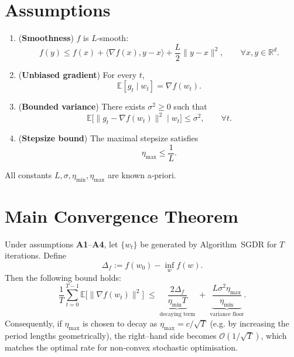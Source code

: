 \documentclass{article}
\begin{document}
\section*{Assumptions}
\begin{enumerate}
  \item[{\bf A1}] (\textbf{Smoothness}) $f$ is $L$‑smooth:
  \[
  f(y)\le f(x)+\langle\nabla f(x),y-x\rangle+\frac{L}{2}\|y-x\|^2,
  \qquad\forall x,y\in\mathbb{R}^d .
  \tag{3}
  \]
  \item[{\bf A2}] (\textbf{Unbiased gradient}) For every $t$,
  \[
  \mathbb{E}[g_t\mid w_t]=\nabla f(w_t).
  \tag{4}
  \]
  \item[{\bf A3}] (\textbf{Bounded variance}) There exists $\sigma^2\ge0$ such
  that
  \[
  \mathbb{E}\!\bigl[\|g_t-\nabla f(w_t)\|^2\mid w_t\bigr]\le\sigma^2,
  \qquad\forall t .
  \tag{5}
  \]
  \item[{\bf A4}] (\textbf{Stepsize bound}) The maximal stepsize satisfies
  \[
  \eta_{\max}\le\frac{1}{L}.
  \tag{6}
  \]
\end{enumerate}
All constants $L,\sigma,\eta_{\min},\eta_{\max}$ are known a‑priori.

\section*{Main Convergence Theorem}
\begin{theorem}\label{thm:sgdr}
Under assumptions {\bf A1}–{\bf A4}, let $\{w_t\}$ be generated by
Algorithm~SGDR for $T$ iterations.  Define
\[
\Delta_f:=f(w_0)-\inf_{w}f(w).
\]
Then the following bound holds:
\[
\frac{1}{T}\sum_{t=0}^{T-1}\mathbb{E}\bigl[\|\nabla f(w_t)\|^2\bigr]
\;\le\;
\underbrace{\frac{2\Delta_f}{\eta_{\min}T}}_{\text{decaying term}}
\;+\;
\underbrace{\frac{L\sigma^2\eta_{\max}}{\eta_{\min}}}_{\text{variance floor}} .
\tag{7}
\]
Consequently, if $\eta_{\max}$ is chosen to decay as
$\eta_{\max}=c/\sqrt{T}$ (e.g. by increasing the period lengths
geometrically), the right–hand side becomes $\mathcal{O}(1/\sqrt{T})$,
which matches the optimal rate for non‑convex stochastic optimisation.
\end{theorem}

\end{document}
